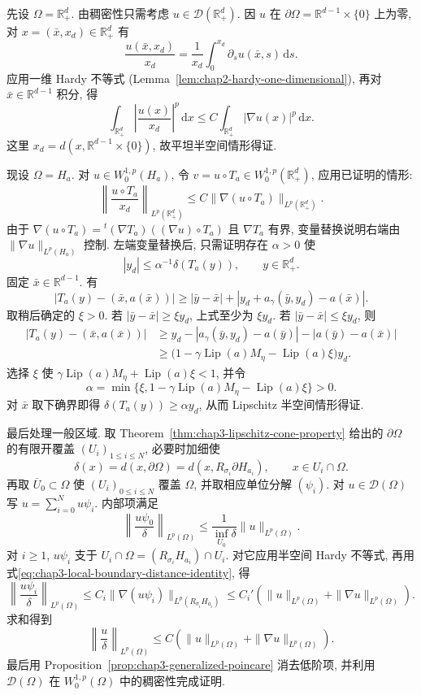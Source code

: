\begin{Proof}
先设 $\Omega=\mathbb R_+^d$. 由稠密性只需考虑 $u\in\mathcal D(\mathbb R_+^d)$. 因 $u$ 在 $\partial\Omega=\mathbb R^{d-1}\times\{0\}$ 上为零, 对 $x=(\bar x,x_d)\in\mathbb R_+^d$ 有
\[
 \frac{u(\bar x,x_d)}{x_d}
 =\frac1{x_d}\int_0^{x_d}\partial_su(\bar x,s)\,\mathrm ds.
\]
应用一维 Hardy 不等式 (Lemma~\ref{lem:chap2-hardy-one-dimensional}), 再对 $\bar x\in\mathbb R^{d-1}$ 积分, 得
\[
 \int_{\mathbb R_+^d}\left|\frac{u(x)}{x_d}\right|^p\,\mathrm dx
 \leq C\int_{\mathbb R_+^d}|\nabla u(x)|^p\,\mathrm dx.
\]
这里 $x_d=d(x,\mathbb R^{d-1}\times\{0\})$, 故平坦半空间情形得证.

现设 $\Omega=H_a$. 对 $u\in W_0^{1,p}(H_a)$, 令 $v=u\circ T_a\in W_0^{1,p}(\mathbb R_+^d)$, 应用已证明的情形:
\[
 \left\|\frac{u\circ T_a}{x_d}\right\|_{L^p(\mathbb R_+^d)}
 \leq C\|\nabla(u\circ T_a)\|_{L^p(\mathbb R_+^d)}.
\]
由于 $\nabla(u\circ T_a)={}^t(\nabla T_a)((\nabla u)\circ T_a)$ 且 $\nabla T_a$ 有界, 变量替换说明右端由 $\|\nabla u\|_{L^p(H_a)}$ 控制. 左端变量替换后, 只需证明存在 $\alpha>0$ 使
\[
 |y_d|\leq\alpha^{-1}\delta(T_a(y)),
 \qquad y\in\mathbb R_+^d.
\]
固定 $\bar x\in\mathbb R^{d-1}$. 有
\[
 |T_a(y)-(\bar x,a(\bar x))|
 \geq|\bar y-\bar x|
 +|y_d+a_\gamma(\bar y,y_d)-a(\bar x)|.
\]
取稍后确定的 $\xi>0$. 若 $|\bar y-\bar x|\geq\xi y_d$, 上式至少为 $\xi y_d$. 若 $|\bar y-\bar x|\leq\xi y_d$, 则
\begin{align*}
 |T_a(y)-(\bar x,a(\bar x))|
 &\geq y_d-|a_\gamma(\bar y,y_d)-a(\bar y)|-|a(\bar y)-a(\bar x)|\\
 &\geq\bigl(1-\gamma\operatorname{Lip}(a)M_\eta
 -\operatorname{Lip}(a)\xi\bigr)y_d.
\end{align*}
选择 $\xi$ 使 $\gamma\operatorname{Lip}(a)M_\eta+\operatorname{Lip}(a)\xi<1$, 并令
\[
 \alpha=\min\{\xi,1-\gamma\operatorname{Lip}(a)M_\eta-\operatorname{Lip}(a)\xi\}>0.
\]
对 $\bar x$ 取下确界即得 $\delta(T_a(y))\geq\alpha y_d$, 从而 Lipschitz 半空间情形得证.

最后处理一般区域. 取 Theorem~\ref{thm:chap3-lipschitz-cone-property} 给出的 $\partial\Omega$ 的有限开覆盖 $(U_i)_{1\leq i\leq N}$, 必要时加细使
\begin{equation}
 \delta(x)=d(x,\partial\Omega)=d(x,R_{\sigma_i}\partial H_{a_i}),
 \qquad x\in U_i\cap\Omega.
 \label{eq:chap3-local-boundary-distance-identity}
\end{equation}
再取 $\overline U_0\subset\Omega$ 使 $(U_i)_{0\leq i\leq N}$ 覆盖 $\Omega$, 并取相应单位分解 $(\psi_i)$. 对 $u\in\mathcal D(\Omega)$ 写 $u=\sum_{i=0}^Nu\psi_i$. 内部项满足
\[
 \left\|\frac{u\psi_0}{\delta}\right\|_{L^p(\Omega)}
 \leq\frac1{\inf_{U_0}\delta}\|u\|_{L^p(\Omega)}.
\]
对 $i\geq1$, $u\psi_i$ 支于 $U_i\cap\Omega=(R_{\sigma_i}H_{a_i})\cap U_i$. 对它应用半空间 Hardy 不等式, 再用式\eqref{eq:chap3-local-boundary-distance-identity}, 得
\[
 \left\|\frac{u\psi_i}{\delta}\right\|_{L^p(\Omega)}
 \leq C_i\|\nabla(u\psi_i)\|_{L^p(R_{\sigma_i}H_{a_i})}
 \leq C_i'(\|u\|_{L^p(\Omega)}+\|\nabla u\|_{L^p(\Omega)}).
\]
求和得到
\[
 \left\|\frac u\delta\right\|_{L^p(\Omega)}
 \leq C(\|u\|_{L^p(\Omega)}+\|\nabla u\|_{L^p(\Omega)}).
\]
最后用 Proposition~\ref{prop:chap3-generalized-poincare} 消去低阶项, 并利用 $\mathcal D(\Omega)$ 在 $W_0^{1,p}(\Omega)$ 中的稠密性完成证明.
\end{Proof}

